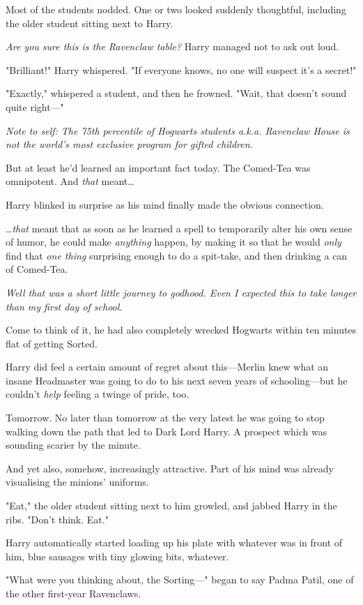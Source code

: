 Most of the students nodded. One or two looked suddenly thoughtful, including 
the older student sitting next to Harry.

\emph{Are you sure this is the Ravenclaw table?} Harry managed not to ask out 
loud.

"Brilliant!" Harry whispered. "If everyone knows, no one will suspect it's a 
secret!"

"Exactly," whispered a student, and then he frowned. "Wait, that doesn't sound 
quite right---"

\emph{Note to self: The 75th percentile of Hogwarts students a.k.a. Ravenclaw 
House is not the world's most exclusive program for gifted children.}

But at least he'd learned an important fact today. The Comed-Tea was 
omnipotent. And \emph{that} meant{\ldots}

Harry blinked in surprise as his mind finally made the obvious connection.

{\ldots}\emph{that} meant that as soon as he learned a spell to temporarily 
alter his own sense of humor, he could make \emph{anything} happen, by making 
it so that he would \emph{only} find that \emph{one thing} surprising enough to 
do a spit-take, and then drinking a can of Comed-Tea.

\emph{Well that was a short little journey to godhood. Even I expected this to 
take longer than my first day of school.}

Come to think of it, he had also completely wrecked Hogwarts within ten minutes 
flat of getting Sorted.

Harry did feel a certain amount of regret about this---Merlin knew what an 
insane Headmaster was going to do to his next seven years of schooling---but he 
couldn't \emph{help} feeling a twinge of pride, too.

Tomorrow. No later than tomorrow at the very latest he was going to stop 
walking down the path that led to Dark Lord Harry. A prospect which was 
sounding scarier by the minute.

And yet also, somehow, increasingly attractive. Part of his mind was already 
visualising the minions' uniforms.

"Eat," the older student sitting next to him growled, and jabbed Harry in the 
ribs. "Don't think. Eat."

Harry automatically started loading up his plate with whatever was in front of 
him, blue sausages with tiny glowing bits, whatever.

"What were you thinking about, the Sorting---" began to say Padma Patil, one of 
the other first-year Ravenclaws.

